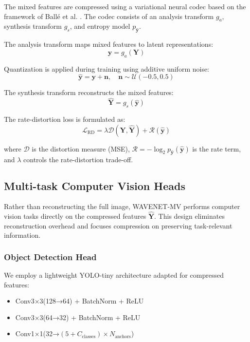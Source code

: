\documentclass[conference]{IEEEtran}
\begin{document}
The mixed features are compressed using a variational neural codec based on the framework of Ballé et al. \cite{balle2018variational}. The codec consists of an analysis transform $g_a$, synthesis transform $g_s$, and entropy model $p_{\hat{\mathbf{y}}}$.

The analysis transform maps mixed features to latent representations:
\begin{equation}
\mathbf{y} = g_a(\mathbf{Y})
\end{equation}

Quantization is applied during training using additive uniform noise:
\begin{equation}
\hat{\mathbf{y}} = \mathbf{y} + \mathbf{n}, \quad \mathbf{n} \sim \mathcal{U}(-0.5, 0.5)
\end{equation}

The synthesis transform reconstructs the mixed features:
\begin{equation}
\hat{\mathbf{Y}} = g_s(\hat{\mathbf{y}})
\end{equation}

The rate-distortion loss is formulated as:
\begin{equation}
\mathcal{L}_{\text{RD}} = \lambda \mathcal{D}(\mathbf{Y}, \hat{\mathbf{Y}}) + \mathcal{R}(\hat{\mathbf{y}})
\end{equation}

where $\mathcal{D}$ is the distortion measure (MSE), $\mathcal{R} = -\log_2 p_{\hat{\mathbf{y}}}(\hat{\mathbf{y}})$ is the rate term, and $\lambda$ controls the rate-distortion trade-off.

\subsection{Multi-task Computer Vision Heads}

Rather than reconstructing the full image, WAVENET-MV performs computer vision tasks directly on the compressed features $\hat{\mathbf{Y}}$. This design eliminates reconstruction overhead and focuses compression on preserving task-relevant information.

\subsubsection{Object Detection Head}
We employ a lightweight YOLO-tiny architecture adapted for compressed features:
\begin{itemize}
\item Conv3×3(128→64) + BatchNorm + ReLU
\item Conv3×3(64→32) + BatchNorm + ReLU
\item Conv1×1(32→$(5+C_{\text{classes}}) \times N_{\text{anchors}}$)
\end{itemize}
\end{document}
